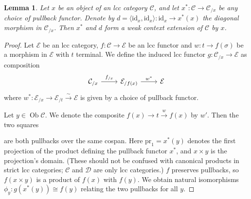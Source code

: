 \documentclass[a4paper]{article}
\newtheorem{lemma}[theorem]{Lemma}
\theoremstyle{remark}
\theoremstyle{definition}
\begin{document}
\begin{lemma}
  \label{lem:slice-is-weak-ext}
  Let $x$ be an object of an lcc category $\mathcal{C}$, and let $x^* : \mathcal{C} \rightarrow \mathcal{C}_{/ x}$ be any choice of pullback functor.
  Denote by $d = \langle \mathrm{id}_x, \mathrm{id}_x \rangle : \mathrm{id}_x \rightarrow x^*(x)$ the diagonal morphism in $\mathcal{C}_{/ x}$.
  Then $x^*$ and $d$ form a weak context extension of $\mathcal{C}$ by $x$.
\end{lemma}
\begin{proof}
  Let $\mathcal{E}$ be an lcc category, $f : \mathcal{C} \rightarrow \mathcal{E}$ be an lcc functor and $w : t \rightarrow f(\sigma)$ be a morphism in $\mathcal{E}$ with $t$ terminal.
  We define the induced lcc functor $g : \mathcal{C}_{/ x} \rightarrow \mathcal{E}$ as composition
  \begin{equation}
    \begin{tikzcd}
      \mathcal{C}_{/ x} \arrow[r, "f_{/ x}"] & \mathcal{E}_{/ f(x)} \arrow[r, "w^*"] & \mathcal{E}
    \end{tikzcd}
  \end{equation}
  where $w^* : \mathcal{E}_{ / x} \rightarrow \mathcal{E}_{/ t} \xrightarrow{\sim} \mathcal{E}$ is given by a choice of pullback functor.

  Let $y \in \operatorname{Ob} \mathcal{C}$.
  We denote the composite $f(x) \rightarrow t \xrightarrow{w} f(x)$ by $w'$.
  Then the two squares
  are both pullbacks over the same cospan.
  Here $\mathrm{pr}_1 = x^*(y)$ denotes the first projection of the product defining the pullback functor $x^*$, and $x \times y$ is the projection's domain.
  (These should not be confused with canonical products in strict lcc categories; $\mathcal{C}$ and $\mathcal{D}$ are only lcc categories.)
  $f$ preserves pullbacks, so $f(x \times y)$ is a product of $f(x)$ with $f(y)$.
  We obtain natural isomorphisms $\phi_y : g(x^*(y)) \cong f(y)$ relating the two pullbacks for all $y$.


\end{proof}
\end{document}
